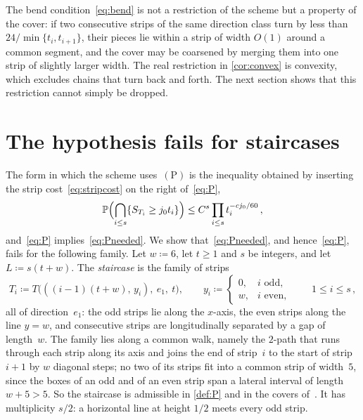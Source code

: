 \documentclass[11pt,letterpaper]{article}
\begin{document}
The bend condition~\eqref{eq:bend} is not a restriction of the scheme but a property of the cover: if two consecutive strips of the same direction class turn by less than $24/\min\{t_i,t_{i+1}\}$, their pieces lie within a strip of width $O(1)$ around a common segment, and the cover may be coarsened by merging them into one strip of slightly larger width. The real restriction in \cref{cor:convex} is convexity, which excludes chains that turn back and forth. The next section shows that this restriction cannot simply be dropped.

\section{The hypothesis fails for staircases}
\label{sec:staircase}

The form in which the scheme uses~$\mathrm{(P)}$ is the inequality obtained by inserting the strip cost~\eqref{eq:stripcost} on the right of~\eqref{eq:P},
\begin{equation}
\label{eq:Pneeded}
  \P\Bigl(\bigcap_{i\le s}\{S_{T_i}\ge j_0t_i\}\Bigr)\le C^s\prod_{i\le s}t_i^{-cj_0/60}\,,
\end{equation}
and~\eqref{eq:P} implies~\eqref{eq:Pneeded}. We show that~\eqref{eq:Pneeded}, and hence~\eqref{eq:P}, fails for the following family. Let $w\coloneqq6$, let $t\ge1$ and $s$ be integers, and let $L\coloneqq s(t+w)$. The \emph{staircase} is the family of strips
\begin{equation*}
  T_i\coloneqq T\bigl(((i-1)(t+w),\,y_i),\ e_1,\ t\bigr),\qquad y_i\coloneqq\begin{cases}0,&i\text{ odd},\\ w,&i\text{ even},\end{cases}\qquad 1\le i\le s\,,
\end{equation*}
all of direction~$e_1$: the odd strips lie along the $x$-axis, the even strips along the line $y=w$, and consecutive strips are longitudinally separated by a gap of length~$w$. The family lies along a common walk, namely the $2$-path that runs through each strip along its axis and joins the end of strip~$i$ to the start of strip~$i+1$ by $w$ diagonal steps; no two of its strips fit into a common strip of width~$5$, since the boxes of an odd and of an even strip span a lateral interval of length~$w+5>5$. So the staircase is admissible in \cref{def:P} and in the covers of~\cite{SC26}. It has multiplicity $s/2$: a horizontal line at height $1/2$ meets every odd strip.
\end{document}
